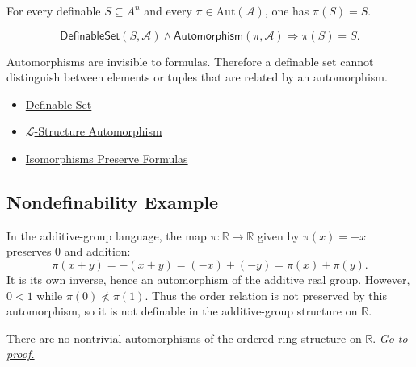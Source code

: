 \begin{remark*}
For every definable $S\subseteq A^n$ and every
$\pi\in\mathrm{Aut}(\mathcal{A})$, one has $\pi(S)=S$.
\end{remark*}

\begin{remark*}
\[
\mathsf{DefinableSet}(S,\mathcal{A})
\land
\mathsf{Automorphism}(\pi,\mathcal{A})
\Longrightarrow
\pi(S)=S.
\]
\end{remark*}

\begin{remark*}[Interpretation]
Automorphisms are invisible to formulas. Therefore a definable set cannot
distinguish between elements or tuples that are related by an automorphism.
\end{remark*}

\begin{dependencies}
\begin{itemize}
  \item \hyperref[def:definable-set]{Definable Set}
  \item \hyperref[def:l-structure-automorphism]{$\mathcal{L}$-Structure Automorphism}
  \item \hyperref[prop:isomorphisms-preserve-formulas]{Isomorphisms Preserve Formulas}
\end{itemize}
\end{dependencies}

\subsection{Nondefinability Example}

\begin{example*}
In the additive-group language, the map $\pi\colon\mathbb{R}\to\mathbb{R}$
given by $\pi(x)=-x$ preserves $0$ and addition:
\[
  \pi(x+y)=-(x+y)=(-x)+(-y)=\pi(x)+\pi(y).
\]
It is its own inverse, hence an automorphism of the additive real group.
However, $0<1$ while $\pi(0)\not<\pi(1)$. Thus the order relation is not
preserved by this automorphism, so it is not definable in the additive-group
structure on $\mathbb{R}$.
\end{example*}

\begin{lemma}\label{lem:no-nontrivial-automorphisms-ordered-real-ring}
There are no nontrivial automorphisms of the ordered-ring structure on
$\mathbb{R}$.
\hyperref[prf:no-nontrivial-automorphisms-ordered-real-ring]{\textit{Go to proof.}}
\end{lemma}

